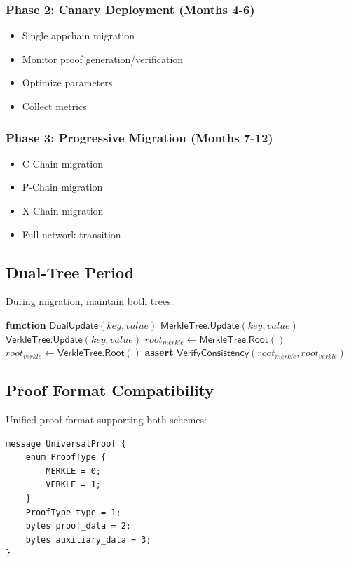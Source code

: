 \documentclass[11pt,a4paper]{article}
\theoremstyle{definition}
\begin{document}
\subsubsection{Phase 2: Canary Deployment (Months 4-6)}
\begin{itemize}
    \item Single appchain migration
    \item Monitor proof generation/verification
    \item Optimize parameters
    \item Collect metrics
\end{itemize}

\subsubsection{Phase 3: Progressive Migration (Months 7-12)}
\begin{itemize}
    \item C-Chain migration
    \item P-Chain migration
    \item X-Chain migration
    \item Full network transition
\end{itemize}

\subsection{Dual-Tree Period}

During migration, maintain both trees:
\begin{algorithmic}[1]
\STATE \textbf{function} $\mathsf{DualUpdate}(key, value)$
\STATE $\mathsf{MerkleTree.Update}(key, value)$
\STATE $\mathsf{VerkleTree.Update}(key, value)$
\STATE $root_{merkle} \gets \mathsf{MerkleTree.Root}()$
\STATE $root_{verkle} \gets \mathsf{VerkleTree.Root}()$
\STATE \textbf{assert} $\mathsf{VerifyConsistency}(root_{merkle}, root_{verkle})$
\end{algorithmic}

\subsection{Proof Format Compatibility}

Unified proof format supporting both schemes:
\begin{lstlisting}[caption=Universal Proof Format]
message UniversalProof {
    enum ProofType {
        MERKLE = 0;
        VERKLE = 1;
    }
    ProofType type = 1;
    bytes proof_data = 2;
    bytes auxiliary_data = 3;
}
\end{lstlisting}
\end{document}
